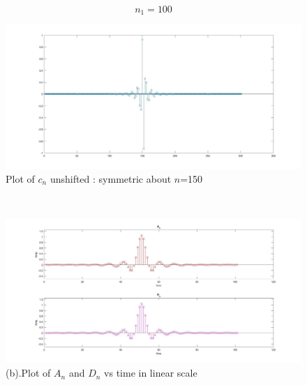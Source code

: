 \documentclass[a4paper, 20pt]{article}
\begin{document}
 \[
 \boxed{n_1=100}
 \]
\begin{figure}[th]%
\centering
\includegraphics[width=1.3\textwidth]{4.jpg}%
\caption{Plot of $c_n$ unshifted : symmetric about $n$=150}%
\label{fig:proto}%
\end{figure}%
 \\
\begin{figure}[th]%
\centering
\includegraphics[width=1.3\textwidth]{3.jpg}%
\caption{(b).Plot of $A_n$ and $D_n$ vs time  in linear scale}%
\label{fig:proto}%
\end{figure}%
\end{document}
